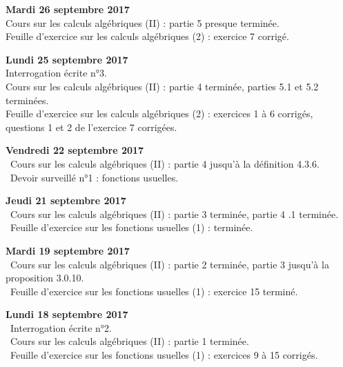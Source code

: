 \documentclass[12pt,a4paper]{article}
\begin{document}
\noindent\textbf{Mardi 26 septembre 2017}\\
\bu{} Cours sur les calculs algébriques (II) : partie 5 presque terminée. \\
\bu{} Feuille d'exercice sur les calculs algébriques (2) : exercice 7 corrigé.  \\
\vspace{.4cm}

\noindent\textbf{Lundi 25 septembre 2017}\\
\bu{} Interrogation écrite n°3.\\
\bu{} Cours sur les calculs algébriques (II) : partie 4 terminée, parties 5.1 et 5.2 terminées. \\
\bu{} Feuille d'exercice sur les calculs algébriques (2) : exercices 1 à 6 corrigés, questions 1 et 2 de l'exercice 7 corrigées.  \\
\vspace{.4cm}

\noindent\textbf{Vendredi 22 septembre 2017}\\
\bu\ Cours sur les calculs algébriques (II) : partie 4 jusqu'à la définition 4.3.6. \\
\bu\ Devoir surveillé n°1 : fonctions usuelles. \\
\vspace{.4cm}

\noindent\textbf{Jeudi 21 septembre 2017}\\
\bu\ Cours sur les calculs algébriques (II) : partie 3 terminée, partie 4 .1 terminée. \\
\bu\ Feuille d'exercice sur les fonctions usuelles (1) : terminée. \\
\vspace{.4cm}

\noindent\textbf{Mardi 19 septembre 2017}\\
\bu\ Cours sur les calculs algébriques (II) : partie 2 terminée, partie 3 jusqu'à la proposition 3.0.10. \\
\bu\ Feuille d'exercice sur les fonctions usuelles (1) : exercice 15 terminé. \\
\vspace{.4cm}

\noindent\textbf{Lundi 18 septembre 2017}\\
\bu\ Interrogation écrite n°2.\\
\bu\ Cours sur les calculs algébriques (II) : partie 1 terminée. \\
\bu\ Feuille d'exercice sur les fonctions usuelles (1) : exercices 9 à 15 corrigés. \\
\vspace{.4cm}
\end{document}
